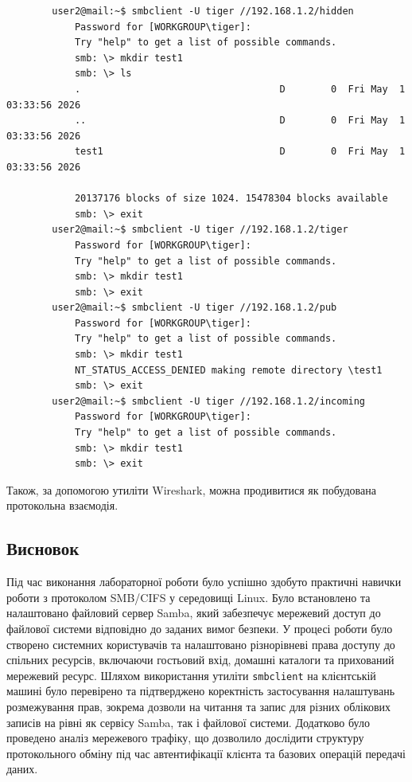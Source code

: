 \documentclass[14pt, a4paper]{extreport}
\begin{document}
	\begin{verbatim}
		user2@mail:~$ smbclient -U tiger //192.168.1.2/hidden
			Password for [WORKGROUP\tiger]:
			Try "help" to get a list of possible commands.
			smb: \> mkdir test1
			smb: \> ls
			.                                   D        0  Fri May  1 03:33:56 2026
			..                                  D        0  Fri May  1 03:33:56 2026
			test1                               D        0  Fri May  1 03:33:56 2026
		
			20137176 blocks of size 1024. 15478304 blocks available
			smb: \> exit
		user2@mail:~$ smbclient -U tiger //192.168.1.2/tiger
			Password for [WORKGROUP\tiger]:
			Try "help" to get a list of possible commands.
			smb: \> mkdir test1
			smb: \> exit
		user2@mail:~$ smbclient -U tiger //192.168.1.2/pub
			Password for [WORKGROUP\tiger]:
			Try "help" to get a list of possible commands.
			smb: \> mkdir test1
			NT_STATUS_ACCESS_DENIED making remote directory \test1
			smb: \> exit
		user2@mail:~$ smbclient -U tiger //192.168.1.2/incoming
			Password for [WORKGROUP\tiger]:
			Try "help" to get a list of possible commands.
			smb: \> mkdir test1
			smb: \> exit
	\end{verbatim}
	
	Також, за допомогою утиліти Wireshark, можна продивитися як побудована протокольна взаємодія.
	
	
	\subsection*{Висновок}
	
	Під час виконання лабораторної роботи було успішно здобуто практичні навички роботи з протоколом SMB/CIFS у середовищі Linux. Було встановлено та налаштовано файловий сервер Samba, який забезпечує мережевий доступ до файлової системи відповідно до заданих вимог безпеки. У процесі роботи було створено системних користувачів та налаштовано різнорівневі права доступу до спільних ресурсів, включаючи гостьовий вхід, домашні каталоги та прихований мережевий ресурс. Шляхом використання утиліти \texttt{smbclient} на клієнтській машині було перевірено та підтверджено коректність застосування налаштувань розмежування прав, зокрема дозволи на читання та запис для різних облікових записів на рівні як сервісу Samba, так і файлової системи. Додатково було проведено аналіз мережевого трафіку, що дозволило дослідити структуру протокольного обміну під час автентифікації клієнта та базових операцій передачі даних.
	
\end{document}
